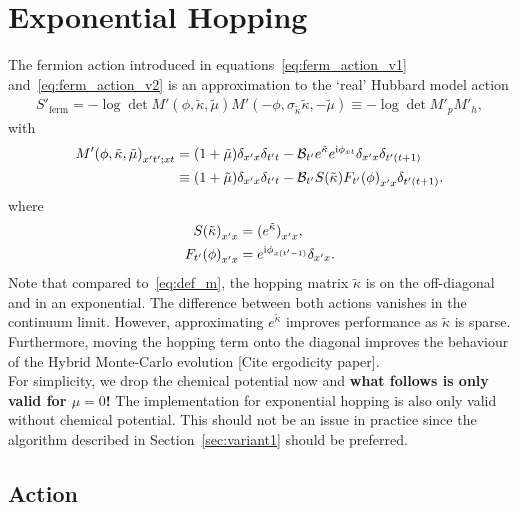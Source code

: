 \documentclass[a4paper, fleqn, twoside, notitlepage]{scrartcl}
\begin{document}
\clearpage
\section{Exponential Hopping}

The fermion action introduced in equations~\eqref{eq:ferm_action_v1} and~\eqref{eq:ferm_action_v2} is an approximation to the `real' Hubbard model action
\begin{align}
  S'_\text{ferm} = - \log \det M'(\phi, \tilde{\kappa}, \tilde{\mu}) M'(-\phi, \sigma_{\tilde{\kappa}}\tilde{\kappa}, -\tilde{\mu}) \equiv - \log \det M'_p M'_h,\label{eq:ferm_action_exp}
\end{align}
with
\begin{align}
  {M'(\phi, \tilde{\kappa}, \tilde{\mu})}_{x't';xt}
  &= (1+\tilde{\mu})\delta_{x'x}\delta_{t't} - \mathcal{B}_{t'} e^{\tilde{\kappa}} e^{\mathrm{i}\phi_{xt}}\delta_{x'x}\delta_{t'(t+1)}\\
  &\equiv (1+\tilde{\mu})\delta_{x'x}\delta_{t't} - \mathcal{B}_{t'}{S(\tilde{\kappa})F_{t'}(\phi)}_{x'x}\delta_{t'(t+1)}.
\end{align}
where
\begin{align}
  {S(\tilde{\kappa})}_{x'x} &= {(e^{\tilde{\kappa}})}_{x'x},\\
  {F_{t'}(\phi)}_{x'x} &= e^{\mathrm{i}\phi_{x(t'-1)}}\delta_{x'x}.
\end{align}
Note that compared to~\eqref{eq:def_m}, the hopping matrix $\tilde{\kappa}$ is on the off-diagonal and in an exponential.
The difference between both actions vanishes in the continuum limit.
However, approximating $e^{\tilde{\kappa}}$ improves performance as $\tilde{\kappa}$ is sparse.
Furthermore, moving the hopping term onto the diagonal improves the behaviour of the Hybrid Monte-Carlo evolution [{\color{rwthrot}Cite ergodicity paper}].\\ %

\noindent
For simplicity, we drop the chemical potential now and \textbf{what follows is only valid for $\mu = 0$!}
The implementation for exponential hopping is also only valid without chemical potential.
This should not be an issue in practice since the algorithm described in Section~\ref{sec:variant1} should be preferred.

\subsection{Action}
\end{document}
